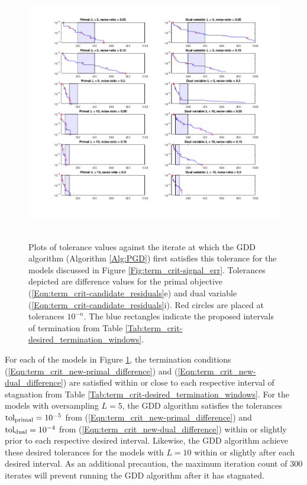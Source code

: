 \begin{figure}[H]
\centering
\hbox{\hspace{-1.4cm} \includegraphics[scale=0.6]{term_crit-pr_and_dual} }\vspace{-1.3cm}
\caption{Plots of tolerance values against the iterate at which the GDD algorithm (Algorithm \ref{Alg:PGD}) first satisfies this tolerance for the models discussed in Figure \ref{Fig:term_crit-signal_err}.  Tolerances depicted are difference values for the primal objective (\ref{Eqn:term_crit-candidate_residuals}e) and dual variable (\ref{Eqn:term_crit-candidate_residuals}i).  Red circles are placed at tolerances $10^{-n}$.  The blue rectangles indicate the proposed intervals of termination from Table \ref{Tab:term_crit-desired_termination_windows}.}
\label{Fig:term_crit-pr_and_dual}
\end{figure}



For each of the models in Figure \ref{Fig:term_crit-pr_and_dual}, the termination conditions (\ref{Eqn:term_crit_new-primal_difference}) and (\ref{Eqn:term_crit_new-dual_difference}) are satisfied within or close to each respective interval of stagnation from Table \ref{Tab:term_crit-desired_termination_windows}.  For the models with oversampling $L = 5$, the GDD algorithm satisfies the tolerances $\textnormal{tol}_\textnormal{primal} = 10^{-5}$ from (\ref{Eqn:term_crit_new-primal_difference}) and $\textnormal{tol}_\textnormal{dual} = 10^{-4}$ from (\ref{Eqn:term_crit_new-dual_difference}) within or slightly prior to each respective desired interval.  Likewise, the GDD algorithm achieve these desired tolerances for the models with $L =10$ within or slightly after each desired interval.  As an additional precaution, the maximum iteration count of 300 iterates will prevent running the GDD algorithm after it has stagnated.

